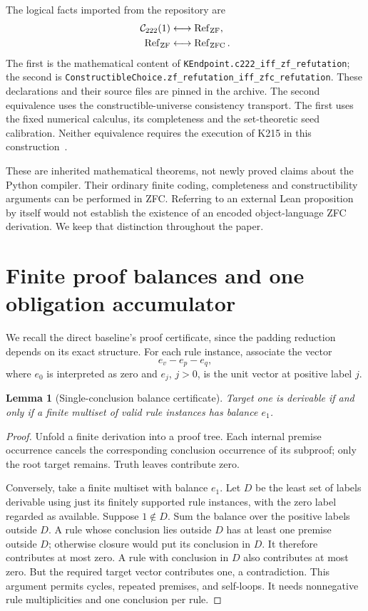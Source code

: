 \documentclass[11pt,a4paper]{article}
\newtheorem{lemma}[theorem]{Lemma}
\theoremstyle{definition}\newtheorem{definition}[theorem]{Definition}
\theoremstyle{remark}\newtheorem{remark}[theorem]{Remark}
\newcommand{\Ccal}{\mathcal C_{222}}\newcommand{\SOS}{\operatorname{SOS}}
\numberwithin{equation}{section}
\begin{document}
The logical facts imported from the repository are
\begin{align}
 \Ccal(1)&\longleftrightarrow\Refut_{\rm ZF},\nonumber\\
 \Refut_{\rm ZF}&\longleftrightarrow\Refut_{\rm ZFC}.
\label{eq:calibration}
\end{align}
The first is the mathematical content of
\texttt{KEndpoint.c222\_iff\_zf\_refutation}; the second is
\texttt{ConstructibleChoice.zf\_refutation\_iff\_zfc\_refutation}.
These declarations and their source files are pinned in the archive.
The second equivalence uses the constructible-universe consistency
transport. The first uses the fixed numerical calculus, its completeness
and the set-theoretic seed calibration. Neither equivalence requires the
execution of K215 in this construction~\cite{calculus,choice}.

These are inherited mathematical theorems, not newly proved claims about
the Python compiler. Their ordinary finite coding, completeness and
constructibility arguments can be performed in ZFC. Referring to an
external Lean proposition by itself would not establish the existence of
an encoded object-language ZFC derivation. We keep that distinction
throughout the paper.

\section{Finite proof balances and one obligation accumulator}
\label{sec:flow}

We recall the direct baseline's proof certificate, since the padding
reduction depends on its exact structure. For each rule instance,
associate the vector
\[
 e_v-e_p-e_q,
\]
where \(e_0\) is interpreted as zero and \(e_j\), \(j>0\), is the
unit vector at positive label \(j\).

\begin{lemma}[Single-conclusion balance certificate]\label{lem:flow}
Target one is derivable if and only if a finite multiset of valid rule
instances has balance \(e_1\).
\end{lemma}
\begin{proof}
Unfold a finite derivation into a proof tree. Each internal premise
occurrence cancels the corresponding conclusion occurrence of its
subproof; only the root target remains. Truth leaves contribute zero.

Conversely, take a finite multiset with balance \(e_1\). Let \(D\) be
the least set of labels derivable using just its finitely supported rule
instances, with the zero label regarded as available. Suppose
\(1\notin D\). Sum the balance over the positive labels outside \(D\).
A rule whose conclusion lies outside \(D\) has at least one premise
outside \(D\); otherwise closure would put its conclusion in \(D\).
It therefore contributes at most zero. A rule with conclusion in \(D\)
also contributes at most zero. But the required target vector contributes
one, a contradiction. This argument permits cycles, repeated premises,
and self-loops. It needs nonnegative rule multiplicities and one
conclusion per rule.
\end{proof}
\end{document}
